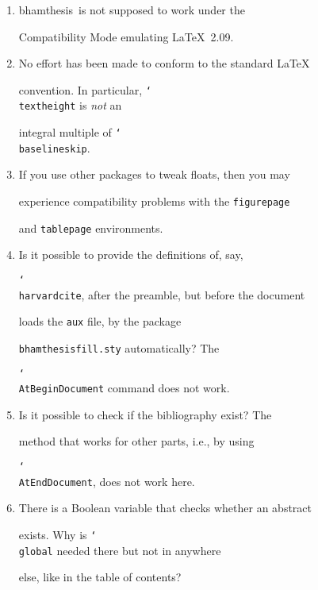 \documentclass{bhamthesis}
\newcommand{\clsname}{\pkg{bhamthesis}}
\newcommand{\bksl}{\char`\\}
\newcommand{\cmd}[1]{\texttt{\bksl{}#1}}
\newcommand{\pkg}[1]{\textsf{#1}}
\newcommand{\file}[1]{\texttt{#1}}
\newcommand{\env}[1]{\texttt{#1}}
\newcommand{\ext}[1]{\texttt{#1}}
\begin{document}
\begin{enumerate}

\item \clsname\ is not supposed to work under the \LaTeXe\

  Compatibility Mode emulating \LaTeX~2.09.

\item No effort has been made to conform to the standard \LaTeX\

  convention.  In particular, \cmd{textheight} is \emph{not} an

  integral multiple of \cmd{baselineskip}.

\item If you use other packages to tweak floats, then you may

  experience compatibility problems with the \env{figurepage}

  and \env{tablepage} environments.

\item Is it possible to provide the definitions of, say,

  \cmd{harvardcite}, after the preamble, but before the document

  loads the \ext{aux} file, by the package

  \file{bhamthesisfill.sty} automatically?  The

  \cmd{AtBeginDocument} command does not work.

\item Is it possible to check if the bibliography exist?  The

  method that works for other parts, i.e., by using

  \cmd{AtEndDocument}, does not work here.

\item There is a Boolean variable that checks whether an abstract

  exists.  Why is \cmd{global} needed there but not in anywhere

  else, like in the table of contents?

\end{enumerate}



\backmatter




\end{document}
